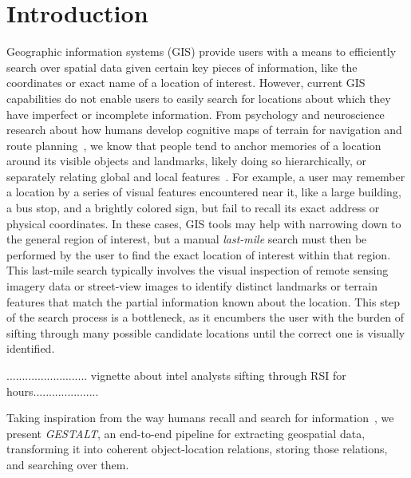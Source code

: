 \section{Introduction}
\label{section:introduction}
Geographic information systems (GIS) provide users with a means to efficiently search over spatial data given certain key pieces of information, like the coordinates or exact name of a location of interest. However, current GIS capabilities do not enable users to easily search for locations about which they have imperfect or incomplete information. From psychology and neuroscience research about how humans develop cognitive maps of terrain for navigation and route planning~\cite{Weisberg2016, Miller2013, Keatley2021, ??}, we know that people tend to anchor memories of a location around its visible objects and landmarks, likely doing so hierarchically, or separately relating global and local features~\cite{Weisberg2016}. For example, a user may remember a location by a series of visual features encountered near it, like a large building, a bus stop, and a brightly colored sign, but fail to recall its exact address or physical coordinates. In these cases, GIS tools may help with narrowing down to the general region of interest, but a manual \emph{last-mile} search must then be performed by the user to find the exact location of interest within that region. This last-mile search typically involves the visual inspection of remote sensing imagery data or street-view images to identify distinct landmarks or terrain features that match the partial information known about the location. This step of the search process is a bottleneck, as it encumbers the user with the burden of sifting through many possible candidate locations until the correct one is visually identified. 

.......................... vignette about intel analysts sifting through RSI for hours.....................

Taking inspiration from the way humans recall and search for information~\cite{Helbing2020, Oliveira2016, Weisberg2016, ?}, we present \emph{GESTALT}, an end-to-end pipeline for extracting geospatial data, transforming it into coherent object-location relations, storing those relations, and searching over them. 

